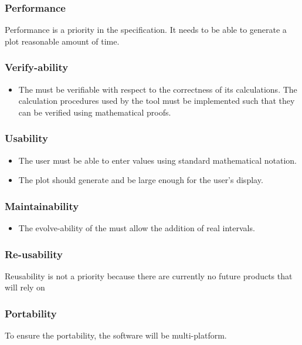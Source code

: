 \documentclass[12pt]{article}
\begin{document}
\subsubsection*{Performance}
Performance is a priority in the \progname specification. 
It needs to be able to generate a plot reasonable amount of time.

\subsubsection*{Verify-ability}
\begin{itemize}
	\item The \progname must be verifiable with respect to the 
	correctness of its calculations. The calculation 
	procedures used by the \progname tool must be implemented such that 
	they can be verified using mathematical proofs.
\end{itemize}

\subsubsection*{Usability}
\begin{itemize}
\item The user must be able to enter values using standard mathematical 
notation.
\item The plot should generate and be large enough for 
the user's display.
\end{itemize}

\subsubsection*{Maintainability}
\begin{itemize}
	\item The evolve-ability of the \progname must allow the addition 
	of real intervals.
\end{itemize}

\subsubsection*{Re-usability}
Reusability is not a priority because there are currently no future products 
that will rely on \progname

\subsubsection*{Portability}
To ensure the portability, the \progname software will be multi-platform.
\end{document}
